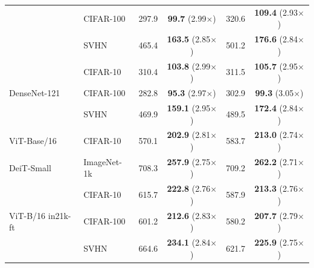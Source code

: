 \begin{table}[t]
\begin{tabular}{ll cc cc}
 & CIFAR-100 & 297.9 & \textbf{99.7} (2.99$\times$) & 320.6 & \textbf{109.4} (2.93$\times$) \\
 & SVHN & 465.4 & \textbf{163.5} (2.85$\times$) & 501.2 & \textbf{176.6} (2.84$\times$) \\
\midrule
\multirow{3}{*}{DenseNet-121} & CIFAR-10 & 310.4 & \textbf{103.8} (2.99$\times$) & 311.5 & \textbf{105.7} (2.95$\times$) \\
 & CIFAR-100 & 282.8 & \textbf{95.3} (2.97$\times$) & 302.9 & \textbf{99.3} (3.05$\times$) \\
 & SVHN & 469.9 & \textbf{159.1} (2.95$\times$) & 489.5 & \textbf{172.4} (2.84$\times$) \\
\midrule
ViT-Base/16 & CIFAR-10 & 570.1 & \textbf{202.9} (2.81$\times$) & 583.7 & \textbf{213.0} (2.74$\times$) \\
\midrule
DeiT-Small & ImageNet-1k & 708.3 & \textbf{257.9} (2.75$\times$) & 709.2 & \textbf{262.2} (2.71$\times$) \\
\midrule
\multirow{3}{*}{ViT-B/16 in21k-ft} & CIFAR-10 & 615.7 & \textbf{222.8} (2.76$\times$) & 587.9 & \textbf{213.3} (2.76$\times$) \\
 & CIFAR-100 & 601.2 & \textbf{212.6} (2.83$\times$) & 580.2 & \textbf{207.7} (2.79$\times$) \\
 & SVHN & 664.6 & \textbf{234.1} (2.84$\times$) & 621.7 & \textbf{225.9} (2.75$\times$) \\
\bottomrule
\end{tabular}
\vspace{-3mm}
\end{table}
